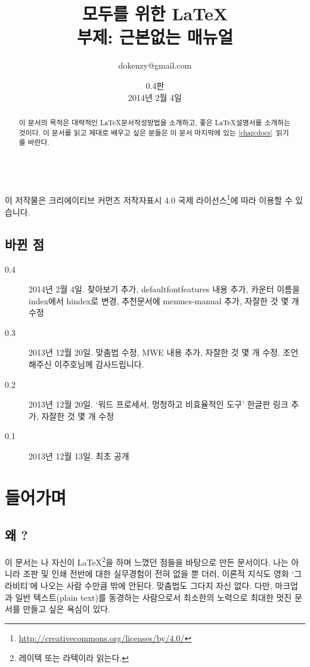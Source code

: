 \documentclass[oneside, chapter, 11pt]{oblivoir}
\title{모두를 위한 \LaTeX\\\small{부제: 근본없는 매뉴얼}}
\author{dokenzy@gmail.com}
\date{0.4판\\2014년 2월 4일}
\newcounter{hindex}
\begin{document}
\maketitle
\begin{abstract}
이 문서의 목적은 대략적인 \LaTeX 문서작성방법을 소개하고, 좋은 \LaTeX 설명서를 소개하는 것이다. 이 문서를 읽고  제대로 배우고 싶은 분들은 이 문서 마지막에 있는 \ref{chap:docs}\chaptername~\을 읽기를 바란다.
\end{abstract}

\begin{center}
\ccbyncsa\\
{\scriptsize 이 저작물은 크리에이티브 커먼즈 저작자표시 4.0 국제 라이선스\footnote{\href{http://creativecommons.org/licenses/by/4.0/}{http://creativecommons.org/licenses/by/4.0/}}에 따라 이용할 수 있습니다.}
\end{center}

\clearpage
\section*{바뀐 점}
\begin{description}
\item[0.4] 2014년 2월 4일. 찾아보기 추가, defaultfontfeatures 내용 추가, 카운터 이름을 index에서 hindex로 변경, 추천문서에 memucs-manual 추가, 자잘한 것 몇 개 수정
\item[0.3] 2013년 12월 20일. 맞춤법 수정, MWE 내용 추가, 자잘한 것 몇 개 수정. 조언해주신 이주호님께 감사드립니다.
\item[0.2] 2013년 12월 20일. `워드 프로세서, 멍청하고 비효율적인 도구' 한글판 링크 추가, 자잘한 것 몇 개 수정
\item[0.1] 2013년 12월 13일. 최초 공개
\end{description}
\clearpage

\tableofcontents

\frontmatter
\chapter{들어가며}
\section{왜 ?}
이 문서는 나 자신이 \LaTeX\footnote{레이텍 또는 라텍이라 읽는다.}을 하며 느꼈던 점들을 바탕으로 만든  문서이다. 나는  아니라 조판 및 인쇄 전반에 대한 실무경험이 전혀 없을 뿐 더러, 이론적 지식도 영화 `그라비티'에 나오는 사람 수만큼 밖에 안된다. 맞춤법도 그다지 자신 없다. 다만, 마크업과 일반 텍스트(plain text)를 동경하는 사람으로서 최소한의 노력으로 최대한 멋진 문서를 만들고 싶은 욕심이 있다. 
\end{document}
